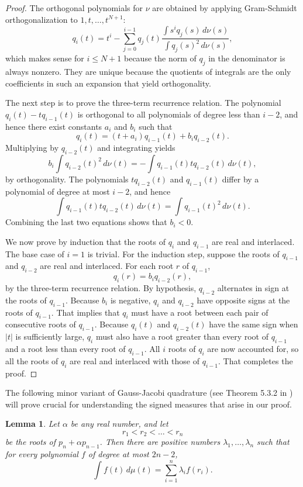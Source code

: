 \documentclass{jams-l}
\theoremstyle{plain}
\newtheorem{lemma}[theorem]{Lemma}
\numberwithin{theorem}{section}
\theoremstyle{definition}
\numberwithin{equation}{section}
\begin{document}
\begin{proof}
The orthogonal polynomials for $\nu$ are obtained by applying
Gram-Schmidt orthogonalization to $1,t,\dots,t^{N+1}$:
$$
q_i(t) = t^i - \sum_{j=0}^{i-1} q_j(t) \frac{\int s^i q_j(s) \,
d\nu(s)}{\int q_j(s)^2 \, d\nu(s)},
$$
which makes sense for $i \le N+1$ because the norm of $q_j$ in the
denominator is always nonzero.  They are unique because the
quotients of integrals are the only coefficients in such an
expansion that yield orthogonality.

The next step is to prove the three-term recurrence relation.  The
polynomial $q_i(t) - tq_{i-1}(t)$ is orthogonal to all polynomials
of degree less than $i-2$, and hence there exist constants $a_i$
and $b_i$ such that
$$
q_i(t) = (t+a_i)q_{i-1}(t) + b_i q_{i-2}(t).
$$
Multiplying by $q_{i-2}(t)$ and integrating yields
$$
b_i \int q_{i-2}(t)^2 \, d\nu(t) = -\int q_{i-1}(t) t q_{i-2}(t)
\, d\nu(t),
$$
by orthogonality.  The polynomials $tq_{i-2}(t)$ and $q_{i-1}(t)$
differ by a polynomial of degree at most $i-2$, and hence
$$
\int q_{i-1}(t) t q_{i-2}(t) \, d\nu(t) = \int q_{i-1}(t)^2 \,
d\nu(t).
$$
Combining the last two equations shows that $b_i < 0$.

We now prove by induction that the roots of $q_i$ and $q_{i-1}$
are real and interlaced.  The base case of $i=1$ is trivial.  For
the induction step, suppose the roots of $q_{i-1}$ and $q_{i-2}$
are real and interlaced.  For each root $r$ of $q_{i-1}$,
$$
q_i(r) = b_i q_{i-2}(r),
$$
by the three-term recurrence relation.  By hypothesis, $q_{i-2}$
alternates in sign at the roots of $q_{i-1}$.  Because $b_i$ is
negative, $q_i$ and $q_{i-2}$ have opposite signs at the roots of
$q_{i-1}$. That implies that $q_i$ must have a root between each
pair of consecutive roots of $q_{i-1}$.  Because $q_i(t)$ and
$q_{i-2}(t)$ have the same sign when $|t|$ is sufficiently large,
$q_i$ must also have a root greater than every root of $q_{i-1}$
and a root less than every root of $q_{i-1}$.  All $i$ roots of
$q_i$ are now accounted for, so all the roots of $q_i$ are real
and interlaced with those of $q_{i-1}$.  That completes the proof.
\end{proof}

The following minor variant of Gauss-Jacobi quadrature (see
Theorem 5.3.2 in \cite{AAR}) will prove crucial for understanding
the signed measures that arise in our proof.

\begin{lemma} \label{lemma:quadrature}
Let $\alpha$ be any real number, and let
$$
r_1 < r_2 < \dots < r_n
$$
be the roots of $p_n + \alpha p_{n-1}$.  Then there are positive
numbers $\lambda_1,\dots,\lambda_n$ such that for every polynomial
$f$ of degree at most $2n-2$,
$$
\int f(t) \,d\mu(t) = \sum_{i=1}^n \lambda_i f(r_i).
$$
\end{lemma}
\end{document}
